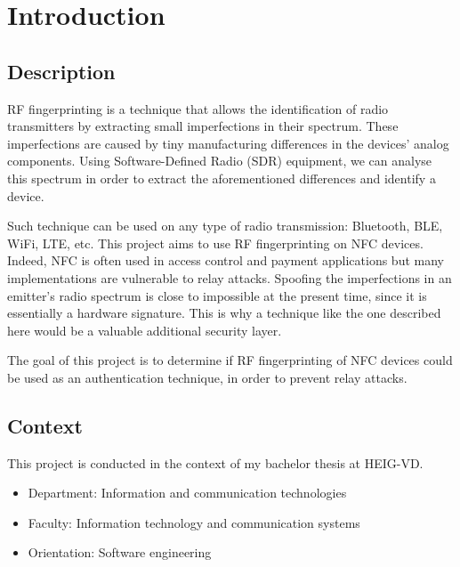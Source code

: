 \section{Introduction}
\subsection{Description}
RF fingerprinting is a technique that allows the identification of radio transmitters by extracting small imperfections in their spectrum. These imperfections are caused by tiny manufacturing differences in the devices' analog components. Using Software-Defined Radio (SDR) equipment, we can analyse this spectrum in order to extract the aforementioned differences and identify a device.

Such technique can be used on any type of radio transmission: Bluetooth, BLE, WiFi, LTE, etc. This project aims to use RF fingerprinting on NFC devices. Indeed, NFC is often used in access control and payment applications but many implementations are vulnerable to relay attacks. Spoofing the imperfections in an emitter's radio spectrum is close to impossible at the present time, since it is essentially a hardware signature. This is why a technique like the one described here would be a valuable additional security layer.

The goal of this project is to determine if RF fingerprinting of NFC devices could be used as an authentication technique, in order to prevent relay attacks.

\subsection{Context}
This project is conducted in the context of my bachelor thesis at HEIG-VD.

\begin{itemize}
  \item Department: Information and communication technologies
  \item Faculty: Information technology and communication systems
  \item Orientation: Software engineering
\end{itemize}
